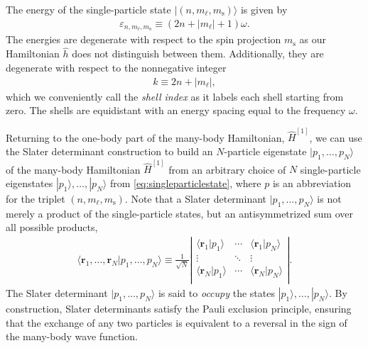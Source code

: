 The energy of the single-particle state $| (n, m_\ell, m_{\mathrm{s}}) \rangle$ is given by
\begin{align} \label{eq:energysingleparticlestate}
  \varepsilon_{n, m_\ell, m_{\mathrm{s}}} \equiv (2 n + |m_\ell| + 1) \omega.
\end{align}
The energies are degenerate with respect to the spin projection $m_{\mathrm{s}}$ as our Hamiltonian $\hat{h}$ does not distinguish between them.  Additionally, they are degenerate with respect to the nonnegative integer
\begin{align} \label{eq:shell_index}
  k \equiv 2 n + |m_\ell|,
\end{align}
which we conveniently call the \textit{shell index} as it labels each
shell starting from zero.  The shells are equidistant with an energy
spacing equal to the frequency $\omega$.

Returning to the one-body part of the many-body Hamiltonian,
$\hat{H}^{[1]}$, we can use the Slater determinant construction to
build an $N$-particle eigenstate $|p_1, \ldots, p_N\rangle$ of the
many-body Hamiltonian $\hat{H}^{[1]}$ from an arbitrary choice of $N$
single-particle eigenstates $|p_1\rangle, \ldots, |p_N\rangle$
from \eqref{eq:singleparticlestate}, where $p$ is an abbreviation for
the triplet $(n, m_\ell, m_{\mathrm{s}})$.  Note that a Slater
determinant $|p_1, \ldots, p_N\rangle$ is not merely a product of the
single-particle states, but an antisymmetrized sum over all possible
products,
\begin{align*}
  \langle \bm{r}_1, \ldots, \bm{r}_N | p_1, \ldots, p_N \rangle \equiv
  \frac{1}{\sqrt{N}} \left|
  \begin{matrix}
    \langle \bm{r}_1 | p_1 \rangle & \cdots & \langle \bm{r}_1 | p_N \rangle \\
    \vdots & \ddots & \vdots \\
    \langle \bm{r}_N | p_1 \rangle & \cdots & \langle \bm{r}_N | p_N \rangle \\
  \end{matrix}
  \right|.
\end{align*}
The Slater determinant $|p_1, \ldots, p_N\rangle$ is said
to \textit{occupy} the states $|p_1\rangle, \ldots, |p_N\rangle$.  By
construction, Slater determinants satisfy the Pauli exclusion
principle, ensuring that the exchange of any two particles is
equivalent to a reversal in the sign of the many-body wave function.

